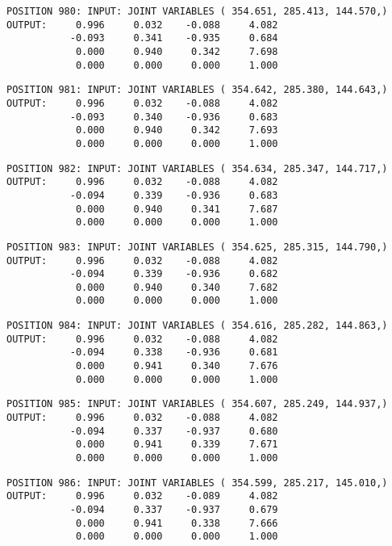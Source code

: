 \begin{verbatim}
POSITION 980: INPUT: JOINT VARIABLES ( 354.651, 285.413, 144.570,)
OUTPUT:     0.996     0.032    -0.088     4.082
           -0.093     0.341    -0.935     0.684
            0.000     0.940     0.342     7.698
            0.000     0.000     0.000     1.000
\end{verbatim} \pagebreak[1]\begin{verbatim}
POSITION 981: INPUT: JOINT VARIABLES ( 354.642, 285.380, 144.643,)
OUTPUT:     0.996     0.032    -0.088     4.082
           -0.093     0.340    -0.936     0.683
            0.000     0.940     0.342     7.693
            0.000     0.000     0.000     1.000
\end{verbatim} \pagebreak[1]\begin{verbatim}
POSITION 982: INPUT: JOINT VARIABLES ( 354.634, 285.347, 144.717,)
OUTPUT:     0.996     0.032    -0.088     4.082
           -0.094     0.339    -0.936     0.683
            0.000     0.940     0.341     7.687
            0.000     0.000     0.000     1.000
\end{verbatim} \pagebreak[1]\begin{verbatim}
POSITION 983: INPUT: JOINT VARIABLES ( 354.625, 285.315, 144.790,)
OUTPUT:     0.996     0.032    -0.088     4.082
           -0.094     0.339    -0.936     0.682
            0.000     0.940     0.340     7.682
            0.000     0.000     0.000     1.000
\end{verbatim} \pagebreak[1]\begin{verbatim}
POSITION 984: INPUT: JOINT VARIABLES ( 354.616, 285.282, 144.863,)
OUTPUT:     0.996     0.032    -0.088     4.082
           -0.094     0.338    -0.936     0.681
            0.000     0.941     0.340     7.676
            0.000     0.000     0.000     1.000
\end{verbatim} \pagebreak[1]\begin{verbatim}
POSITION 985: INPUT: JOINT VARIABLES ( 354.607, 285.249, 144.937,)
OUTPUT:     0.996     0.032    -0.088     4.082
           -0.094     0.337    -0.937     0.680
            0.000     0.941     0.339     7.671
            0.000     0.000     0.000     1.000
\end{verbatim} \pagebreak[1]\begin{verbatim}
POSITION 986: INPUT: JOINT VARIABLES ( 354.599, 285.217, 145.010,)
OUTPUT:     0.996     0.032    -0.089     4.082
           -0.094     0.337    -0.937     0.679
            0.000     0.941     0.338     7.666
            0.000     0.000     0.000     1.000
\end{verbatim} \pagebreak[1]\begin{verbatim}

\end{verbatim}

